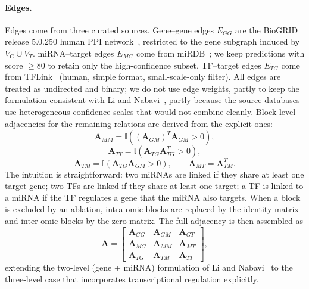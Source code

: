 \documentclass[review,3p,times,11pt, ]{elsarticle} %
\begin{document}
\paragraph{Edges.}
Edges come from three curated sources. Gene--gene edges $E_{GG}$ are
the BioGRID release 5.0.250 human PPI network~\cite{stark_biogrid_2006},
restricted to the gene subgraph induced by $V_G \cup V_T$.
miRNA--target edges $E_{MG}$ come from miRDB~\cite{chen_mirdb_2020};
we keep predictions with score $\geq 80$ to retain only the
high-confidence subset. TF--target edges $E_{TG}$ come from
TFLink~\cite{liska_tflink_2022} (human, simple format,
small-scale-only filter). All edges are treated as undirected and
binary; we do not use edge weights, partly to keep the formulation
consistent with Li and Nabavi~\cite{li_multimodal_2024}, partly because
the source databases use heterogeneous confidence scales that would not
combine cleanly. Block-level adjacencies for the remaining relations
are derived from the explicit ones:
%
\begin{equation}
    \mathbf{A}_{MM} = \mathbb{I}\!\left((\mathbf{A}_{GM})^{\!T}\mathbf{A}_{GM} > 0\right),
    \label{eq:Amm}
\end{equation}
\begin{equation}
    \mathbf{A}_{TT} = \mathbb{I}\!\left(\mathbf{A}_{TG}\mathbf{A}_{TG}^{\!T} > 0\right),
    \label{eq:Att}
\end{equation}
\begin{equation}
    \mathbf{A}_{TM} = \mathbb{I}\!\left(\mathbf{A}_{TG}\mathbf{A}_{GM} > 0\right),
    \qquad
    \mathbf{A}_{MT} = \mathbf{A}_{TM}^{\!T}.
    \label{eq:Atm}
\end{equation}
%
The intuition is straightforward: two miRNAs are linked if they share
at least one target gene; two TFs are linked if they share at least one
target; a TF is linked to a miRNA if the TF regulates a gene that the
miRNA also targets. When a block is excluded by an ablation, intra-omic
blocks are replaced by the identity matrix and inter-omic blocks by the
zero matrix. The full adjacency is then assembled as
%
\begin{equation}
    \mathbf{A} =
    \begin{bmatrix}
        \mathbf{A}_{GG} & \mathbf{A}_{GM} & \mathbf{A}_{GT} \\
        \mathbf{A}_{MG} & \mathbf{A}_{MM} & \mathbf{A}_{MT} \\
        \mathbf{A}_{TG} & \mathbf{A}_{TM} & \mathbf{A}_{TT}
    \end{bmatrix},
\end{equation}
%
extending the two-level (gene + miRNA) formulation of Li and
Nabavi~\cite{li_multimodal_2024} to the three-level case that
incorporates transcriptional regulation explicitly.
\end{document}
